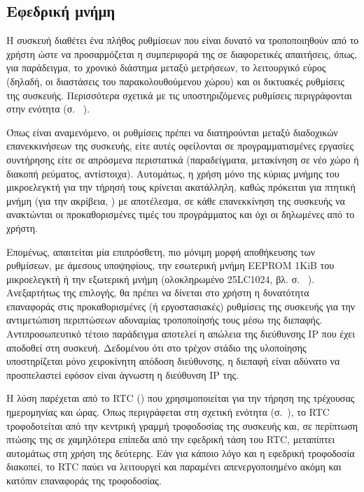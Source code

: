 \subsection{Εφεδρική μνήμη}
\label{subsec:backup-memory}

Η συσκευή διαθέτει ένα πλήθος ρυθμίσεων που είναι δυνατό να τροποποιηθούν από το
χρήστη ώστε να προσαρμόζεται η συμπεριφορά της σε διαφορετικές απαιτήσεις, όπως,
για παράδειγμα, το χρονικό διάστημα μεταξύ μετρήσεων, το λειτουργικό εύρος
(δηλαδή, οι διαστάσεις του παρακολουθούμενου χώρου) και οι δικτυακές ρυθμίσεις
της συσκευής. Περισσότερα σχετικά με τις υποστηριζόμενες ρυθμίσεις περιγράφονται
στην ενότητα  (σ.~%
\pageref{subsec:network:config}).

Όπως είναι αναμενόμενο, οι ρυθμίσεις πρέπει να διατηρούνται μεταξύ διαδοχικών
επανεκκινήσεων της συσκευής, είτε αυτές οφείλονται σε προγραμματισμένες
εργασίες συντήρησης είτε σε απρόσμενα περιστατικά (παραδείγματα, μετακίνηση σε
νέο χώρο ή διακοπή ρεύματος, αντίστοιχα). Αυτομάτως, η χρήση μόνο της κύριας
μνήμης του μικροελεγκτή για την τήρησή τους κρίνεται ακατάλληλη, καθώς πρόκειται
για πτητική μνήμη (για την ακρίβεια, ) με αποτέλεσμα, σε κάθε
επανεκκίνηση της συσκευής να ανακτώνται οι προκαθορισμένες τιμές του
προγράμματος και όχι οι δηλωμένες από το χρήστη.

Επομένως, απαιτείται μία επιπρόσθετη, πιο μόνιμη μορφή αποθήκευσης των
ρυθμίσεων, με άμεσους υποψηφίους, την εσωτερική μνήμη EEPROM 1KiB του
μικροελεγκτή ή την εξωτερική μνήμη  (ολοκληρωμένο 25LC1024, βλ. σ.~%
\pageref{subsec:external-memory}). Ανεξαρτήτως της επιλογής, θα πρέπει να
δίνεται στο χρήστη η δυνατότητα επαναφοράς στις προκαθορισμένες (ή
εργοστασιακές) ρυθμίσεις της συσκευής για την αντιμετώπιση περιπτώσεων αδυναμίας
τροποποίησής τους μέσω της διεπαφής. Αντιπροσωπευτικό τέτοιο παράδειγμα αποτελεί
η απώλεια της διεύθυνσης IP που έχει αποδοθεί στη συσκευή. Δεδομένου ότι στο
τρέχον στάδιο της υλοποίησης υποστηρίζεται μόνο χειροκίνητη απόδοση διεύθυνσης,
η διεπαφή είναι αδύνατο να προσπελαστεί εφόσον είναι άγνωστη η διεύθυνση IP της.

Η λύση παρέχεται από το RTC () που χρησιμοποιείται για την
τήρηση της τρέχουσας ημερομηνίας και ώρας. Όπως περιγράφεται στη σχετική ενότητα
 (σ.~\pageref{sec:rtc}), το RTC τροφοδοτείται από την κεντρική
γραμμή τροφοδοσίας της συσκευής και, σε περίπτωση πτώσης της σε χαμηλότερα
επίπεδα από την εφεδρική τάση του RTC, μεταπίπτει αυτομάτως στη χρήση της
δεύτερης. Εάν για κάποιο λόγο και η εφεδρική τροφοδοσία διακοπεί, το RTC παύει
να λειτουργεί και παραμένει απενεργοποιημένο ακόμη και κατόπιν επαναφοράς της
τροφοδοσίας.

